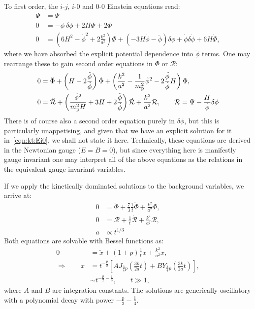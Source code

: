 To first order, the $i$-$j$, $i$-$0$ and $0$-$0$ Einstein equations read:
\begin{align}
  \Phi &= \Psi 
  \label{eqn:kt:Eij} \\
  0 &= -\dot{\phi}\:\delta\phi  + 2 H \Phi + 2 \dot{\Phi} 
  \label{eqn:kt:Ei0}\\
  0 &= \left(6H^2-\dot{\phi}^2 + 2\frac{k^2}{a^2}\right)\Phi  + \left( -3H\dot{\phi} - \ddot{\phi} \right)\delta\phi + \dot{\phi}\delta\dot{\phi} +  6 H \dot{\Phi},
  \label{eqn:kt:E00}
\end{align}
where we have absorbed the explicit potential dependence into $\ddot{\phi}$ terms. 
One may rearrange these to gain second order equations in $\Phi$ or $\mathcal{R}$:
\begin{align}
  0 &= \ddot{\Phi} + \left( H - 2 \frac{\ddot{\phi}}{\dot{\phi}} \right) \dot{\Phi} + \left( \frac{k^2}{a^2}-\frac{1}{m_{\mathrm{p}}^2}\dot{\phi}^2 - 2\frac{\ddot{\phi}}{\dot{\phi}}H \right)\Phi, \\
  0 &= \ddot{\mathcal{R}} + \left( \frac{\dot{\phi}^2}{m_{\mathrm{p}}^2H} + 3H + 2\frac{\ddot{\phi}}{\dot{\phi}} \right)\dot{\mathcal{R}} + \frac{k^2}{a^2}\mathcal{R}, \qquad \mathcal{R} = \Psi - \frac{H}{\dot{\phi}}\delta\phi
\end{align}
There is of course also a second order equation purely in $\delta\phi$, but this is particularly unappetising, and given that we have an explicit solution for it in~\eqref{eqn:kt:Ei0}, we shall not state it here.
Technically, these equations are derived in the Newtonian gauge ($E=B=0$), but since everything here is manifestly gauge invariant one may interpret all of the above equations as the relations in the equivalent gauge invariant variables.

If we apply the kinetically dominated solutions to the background variables, we arrive at:
\begin{align}
  0 &= \ddot{\Phi} + \frac{7}{3}\frac{1}{t}\dot{\Phi} + \frac{k^2}{a^2} \Phi,\\
  0 &= \ddot{\mathcal{R}} + \frac{1}{t}\dot{\mathcal{R}} + \frac{k^2}{a^2} \mathcal{R},\\
  a &\propto t^{1/3}
\end{align}
Both equations are solvable with Bessel functions as:
\begin{align}
  0 &=\ddot{x} + (1+p)\frac{1}{t}\dot{x} + \frac{k^2}{a^2} x,  \\
  \Rightarrow \qquad
  x &= t^{-\frac{p}{2}}\left[ A J_{\frac{3}{4}p}\left( \frac{3k}{2a} t \right) + B Y_{\frac{3}{4}p}\left( \frac{3k}{2a} t \right) \right], \\
  &\sim  t^{-\frac{p}{2}-\frac{1}{3}}, \qquad t \gg 1,
\end{align}
where $A$ and $B$ are integration constants. The solutions are generically oscillatory with a polynomial decay with power $-\frac{p}{2} - \frac{1}{3}$.

